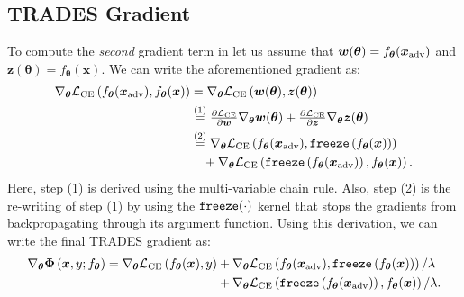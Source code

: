 \documentclass[runningheads]{llncs}
\begin{document}
\subsection{TRADES Gradient}\label{ap:trades_gradient}
To compute the \textit{second} gradient term in  let us assume that $\boldsymbol{w}(\boldsymbol{\theta}) = f_{\boldsymbol{\theta}}(\boldsymbol{x}_{\rm{adv}})$ and $\boldsymbol{z}(\boldsymbol{\theta}) = f_{\boldsymbol{\theta}}(\boldsymbol{x})$.
We can write the aforementioned gradient as:
\begin{align}\label{eq:trades_chain_rule_ap}\nonumber
    \nabla_{\boldsymbol{\theta}} \mathcal{L}_{\mathrm{CE}}\left(f_{\boldsymbol{\theta}}(\boldsymbol{x}_{\rm{adv}}), f_{\boldsymbol{\theta}}(\boldsymbol{x})\right) 
    & = \nabla_{\boldsymbol{\theta}} \mathcal{L}_{\mathrm{CE}}\left(\boldsymbol{w}(\boldsymbol{\theta}), \boldsymbol{z}(\boldsymbol{\theta})\right)\\\nonumber
    &\stackrel{(1)}{=} \tfrac{\partial \mathcal{L}_{\mathrm{CE}}}{\partial \boldsymbol{w}} \nabla_{\boldsymbol{\theta}}\boldsymbol{w}(\boldsymbol{\theta}) + \tfrac{\partial \mathcal{L}_{\mathrm{CE}}}{\partial \boldsymbol{z}} \nabla_{\boldsymbol{\theta}}\boldsymbol{z}(\boldsymbol{\theta})\\\nonumber
    &\stackrel{(2)}{=} \nabla_{\boldsymbol{\theta}} \mathcal{L}_{\mathrm{CE}}\left(f_{\boldsymbol{\theta}}(\boldsymbol{x}_{\rm{adv}}), \text{\texttt{freeze}}\left(f_{\boldsymbol{\theta}}(\boldsymbol{x})\right)\right) \\ 
    &\quad + \nabla_{\boldsymbol{\theta}} \mathcal{L}_{\mathrm{CE}}\left(\text{\texttt{freeze}}\left(f_{\boldsymbol{\theta}}(\boldsymbol{x}_{\rm{adv}})\right), f_{\boldsymbol{\theta}}(\boldsymbol{x})\right).
\end{align}
Here, step (1) is derived using the multi-variable chain rule. 
Also, step (2) is the re-writing of step (1) by using the $\text{\texttt{freeze}}(\cdot)$ kernel that stops the gradients from backpropagating through its argument function.
Using this derivation, we can write the final TRADES gradient as:
\begin{align}\nonumber
	\nabla_{\boldsymbol{\theta}}\boldsymbol{\Phi} \left(\boldsymbol{x}, y; f_{\boldsymbol{\theta}}\right)
	= \nabla_{\boldsymbol{\theta}}\mathcal{L}_{\mathrm{CE}}\left(f_{\boldsymbol{\theta}}(\boldsymbol{x}), y\right)
	&+ \nabla_{\boldsymbol{\theta}} \mathcal{L}_{\mathrm{CE}}\left(f_{\boldsymbol{\theta}}(\boldsymbol{x}_{\rm{adv}}), \text{\texttt{freeze}}\left(f_{\boldsymbol{\theta}}(\boldsymbol{x})\right)\right)/\lambda \\ \label{eq:nn_gradeint_trades_final}
	&+ \nabla_{\boldsymbol{\theta}} \mathcal{L}_{\mathrm{CE}}\left(\text{\texttt{freeze}}\left(f_{\boldsymbol{\theta}}(\boldsymbol{x}_{\rm{adv}})\right), f_{\boldsymbol{\theta}}(\boldsymbol{x})\right)/\lambda.
\end{align}
\end{document}

